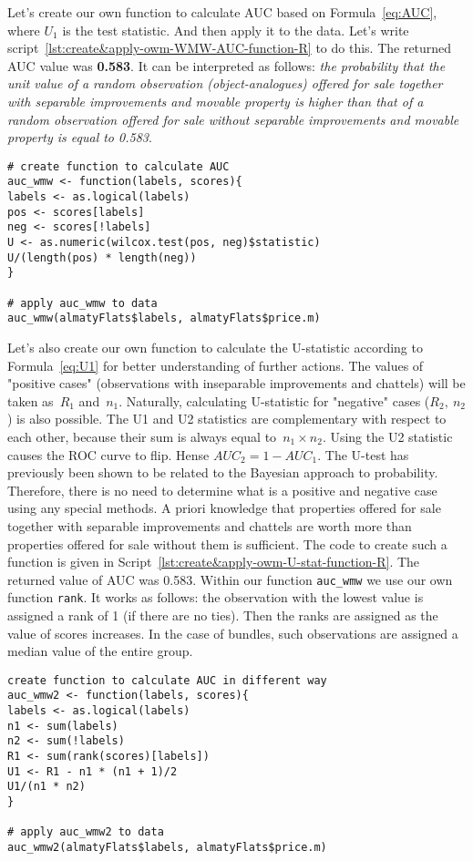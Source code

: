 \documentclass[]{scrreprt}
\begin{document}
Let's create our own function to calculate AUC based on Formula~\ref{eq:AUC}, where $U_{1}$ is the test statistic. And then apply it to the data. Let's write script~\ref{lst:create&apply-owm-WMW-AUC-function-R} to do this. The returned AUC value was \textbf{0.583}. It can be interpreted as follows: \emph{the probability that the unit value of a random observation (object-analogues) offered for sale together with separable improvements and movable property is higher than that of a random observation offered for sale without separable improvements and movable property is equal to 0.583}.
%
\begin{lstlisting}[float=htp, caption = Create your own function to calculate the AUC and apply it to the data of the Almaty market., firstnumber=1, label= lst:create&apply-owm-WMW-AUC-function-R]
# create function to calculate AUC
auc_wmw <- function(labels, scores){
labels <- as.logical(labels)
pos <- scores[labels]
neg <- scores[!labels]
U <- as.numeric(wilcox.test(pos, neg)$statistic)
U/(length(pos) * length(neg))
}

# apply auc_wmw to data
auc_wmw(almatyFlats$labels, almatyFlats$price.m)
\end{lstlisting}
%

Let's also create our own function to calculate the U-statistic according to Formula~\ref{eq:U1} for better understanding of further actions. The values of "positive cases" (observations with inseparable improvements and chattels) will be taken as~$R_{1}$ and~$n_{1}$. Naturally, calculating U-statistic for "negative" cases ($R_{2},\ n_{2}$) is also possible. The U1 and U2 statistics are complementary with respect to each other, because their sum is always equal to~$n_{1} \times n_{2}$. Using the U2 statistic causes the ROC curve to flip. Hense $AUC_{2}=1-AUC_{1}$. The U-test has previously been shown to be related to the Bayesian approach to probability. Therefore, there is no need to determine what is a positive and negative case using any special methods. A priori knowledge that properties offered for sale together with separable improvements and chattels are worth more than properties offered for sale without them is sufficient. The code to create such a function is given in Script~\ref{lst:create&apply-owm-U-stat-function-R}. The returned value of AUC was 0.583. Within our function \texttt{auc\_wmw} we use our own function \texttt{rank}. It works as follows: the observation with the lowest value is assigned a rank of 1 (if there are no ties). Then the ranks are assigned as the value of scores increases. In the case of bundles, such observations are assigned a median value of the entire group.
%
\begin{lstlisting}[float=htp, caption = Creation of own function to calculate U-statistic and its application to Almaty market data, firstnumber=1, label= lst:create&apply-owm-U-stat-function-R]
create function to calculate AUC in different way
auc_wmw2 <- function(labels, scores){
labels <- as.logical(labels)
n1 <- sum(labels)
n2 <- sum(!labels)
R1 <- sum(rank(scores)[labels])
U1 <- R1 - n1 * (n1 + 1)/2
U1/(n1 * n2)
}

# apply auc_wmw2 to data
auc_wmw2(almatyFlats$labels, almatyFlats$price.m)
\end{lstlisting}
%
\end{document}

